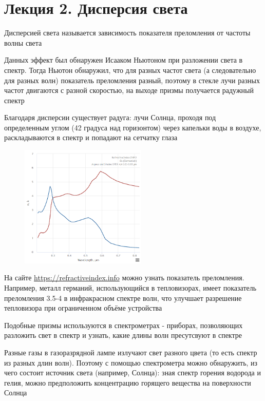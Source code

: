 \documentclass[12pt]{article}
\begin{document}
\section{Лекция 2. Дисперсия света}

Дисперсией света называется зависимость показателя преломления от частоты волны света

Данных эффект был обнаружен Исааком Ньютоном при разложении света в спектр. Тогда Ньютон обнаружил, что для разных частот света (а следовательно для разных волн) показатель преломления разный, поэтому в стекле лучи разных частот двигаются с разной скоростью, на выходе призмы получается радужный спектр 

Благодаря дисперсии существует радуга: лучи Солнца, проходя под определенным углом (42 градуса над горизонтом) через капельки воды в воздухе, раскладываются в спектр и попадают на сетчатку глаза

\begin{figure}
    \includegraphics[width=6cm]{physics3/images/physics3_germanium_refractive_index}
\end{figure}

На сайте \url{https://refractiveindex.info} можно узнать показатель преломления. Например, металл германий, использующийся в тепловизорах, имеет показатель преломления 3.5-4 в инфракрасном спектре волн, что улучшает разрешение тепловизора при ограниченном объёме устройства

Подобные призмы используются в спектрометрах - приборах, позволяющих разложить свет в спектр и узнать, какие длины волн пресутсвуют в спектре

Разные газы в газоразрядной лампе излучают свет разного цвета (то есть спектр из разных длин волн). Поэтому с помощью спектрометра можно обнаружить, из чего состоит источник света (например, Солнца): зная спектр горения водорода и гелия, можно предположить концентрацию горящего вещества на поверхности Солнца
\end{document}
